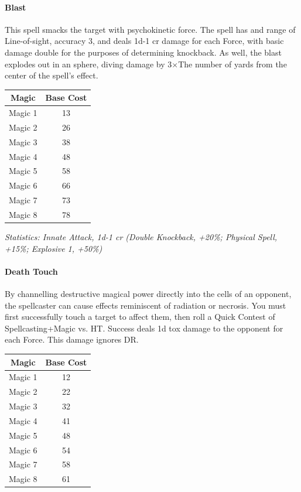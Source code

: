 \begin{multicols*}{3}
	\paragraph{Blast}
	
	This spell smacks the target with psychokinetic force. The spell has and range of Line-of-sight, accuracy 3, and deals 1d-1 cr damage for each Force, with basic damage double for the purposes of determining knockback. As well, the blast explodes out in an sphere, diving damage by 3\(\times\)The number of yards from the center of the spell's effect. 
	
	\begin{center}
		\begin{tabular}{|c|c|}
			\hline
			Magic & Base Cost \\
			\hline
			\hline
			Magic 1 & 13 \\
			Magic 2 & 26 \\
			Magic 3 & 38 \\
			Magic 4 & 48 \\
			Magic 5 & 58 \\
			Magic 6 & 66 \\
			Magic 7 & 73 \\
			Magic 8 & 78 \\
			\hline
		\end{tabular}
	\end{center}
	
	\textcolor{OliveGreen}{\textit{Statistics: Innate Attack, 1d-1 cr (Double Knockback, +20\%; Physical Spell, +15\%; Explosive 1, +50\%)}}
	
	\paragraph{Death Touch}
	
	By channelling destructive magical power directly into the cells of an opponent, the spellcaster can cause effects reminiscent of radiation or necrosis. You must first successfully touch a target to affect them, then roll a Quick Contest of Spellcasting+Magic vs. HT. Success deals 1d tox damage to the opponent for each Force. This damage ignores DR.
	
	\begin{center}
		\begin{tabular}{|c|c|}
			\hline
			Magic & Base Cost \\
			\hline
			\hline
			Magic 1 & 12 \\
			Magic 2 & 22 \\
			Magic 3 & 32 \\
			Magic 4 & 41 \\
			Magic 5 & 48 \\
			Magic 6 & 54 \\
			Magic 7 & 58 \\
			Magic 8 & 61 \\
			\hline
		\end{tabular}
	\end{center}
	

\end{multicols*}
